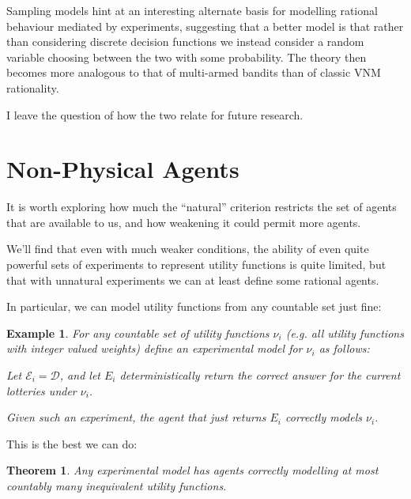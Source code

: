 \documentclass[a4paper]{book}
\newtheorem{theorem}{Theorem}[section]
\newtheorem{example}{Example}[section]
\begin{document}
Sampling models hint at an interesting alternate basis for modelling
rational behaviour mediated by experiments, suggesting that a better
model is that rather than considering discrete decision functions
we instead consider a random variable choosing between the two with
some probability. The theory then becomes more analogous to that
of multi-armed bandits than of classic VNM rationality.

I leave the question of how the two relate for future research.

\section{Non-Physical Agents}
It is worth exploring how much the ``natural'' criterion restricts the
set of agents that are available to us, and how weakening it could
permit more agents.

We'll find that even with much weaker conditions,  the ability of even
quite powerful sets of experiments to represent utility functions is quite limited,
but that with unnatural experiments we can at least define some rational agents.

In particular, we can model utility functions from any countable set just fine:

\begin{example}
For any countable set of utility functions \(\nu_i\) (e.g. all utility functions
with integer valued weights) define an experimental model for $\nu_i$
as follows:

Let \(\mathcal{E}_i = \mathcal{D}\), and let $E_i$ deterministically return the
correct answer for the current lotteries under $\nu_i$.

Given such an experiment, the agent that just returns $E_i$ correctly models $\nu_i$.
\end{example}

This is the best we can do:

\begin{theorem}
Any experimental model has agents correctly modelling at most countably
many inequivalent utility functions. 
\end{theorem}
\end{document}
